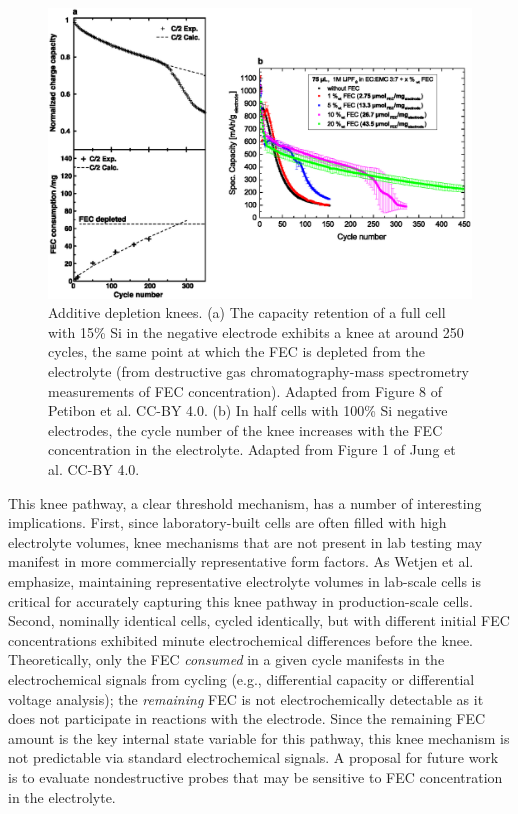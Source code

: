 \documentclass[journal=jpclcd,manuscript=article]{achemso}
\begin{document}
\begin{figure}[ht]
\centering
\includegraphics[scale = 0.9]{figures/fec_depletion.eps}
\caption{Additive depletion knees.
(a) The capacity retention of a full cell with 15\% Si in the negative electrode exhibits a knee at around 250 cycles, the same point at which the FEC is depleted from the electrolyte (from destructive gas chromatography-mass spectrometry measurements of FEC concentration). Adapted from Figure 8 of Petibon et al.\cite{petibon_studies_2016} CC-BY 4.0.
(b) In half cells with 100\% Si negative electrodes, the cycle number of the knee increases with the FEC concentration in the electrolyte. Adapted from Figure 1 of Jung et al.\cite{jung_consumption_2016} CC-BY 4.0.}  
\label{fig:fec_knee}
\end{figure}

This knee pathway, a clear threshold mechanism, has a number of interesting implications.
First, since laboratory-built cells are often filled with high electrolyte volumes, knee mechanisms that are not present in lab testing may manifest in more commercially representative form factors.
As Wetjen et al.\cite{wetjen_differentiating_2017} emphasize,
maintaining representative electrolyte volumes in lab-scale cells is critical for accurately capturing this knee pathway in production-scale cells.
Second, nominally identical cells, cycled identically, but with different initial FEC concentrations exhibited minute electrochemical differences before the knee.\cite{jung_consumption_2016}
Theoretically, only the FEC \textit{consumed} in a given cycle manifests in the electrochemical signals from cycling (e.g., differential capacity or differential voltage analysis); the \textit{remaining} FEC is not electrochemically detectable as it does not participate in reactions with the electrode.
Since the remaining FEC amount is the key internal state variable for this pathway, this knee mechanism is not predictable via standard electrochemical signals.
A proposal for future work is to evaluate nondestructive probes that may be sensitive to FEC concentration in the electrolyte.
\end{document}

